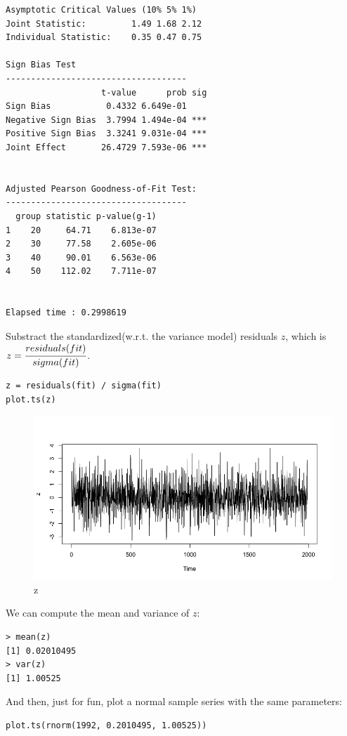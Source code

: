 \documentclass[a4paper, 11pt]{article}
\begin{document}
\begin{verbatim}
Asymptotic Critical Values (10% 5% 1%)
Joint Statistic:     	 1.49 1.68 2.12
Individual Statistic:	 0.35 0.47 0.75

Sign Bias Test
------------------------------------
                   t-value      prob sig
Sign Bias           0.4332 6.649e-01    
Negative Sign Bias  3.7994 1.494e-04 ***
Positive Sign Bias  3.3241 9.031e-04 ***
Joint Effect       26.4729 7.593e-06 ***


Adjusted Pearson Goodness-of-Fit Test:
------------------------------------
  group statistic p-value(g-1)
1    20     64.71    6.813e-07
2    30     77.58    2.605e-06
3    40     90.01    6.563e-06
4    50    112.02    7.711e-07


Elapsed time : 0.2998619 
\end{verbatim}

\indent Substract the standardized(w.r.t. the variance model) residuals $z$, which is $z = \cfrac{residuals(fit)}{sigma(fit)}$.

\begin{verbatim}
z = residuals(fit) / sigma(fit)
plot.ts(z)
\end{verbatim}

\begin{figure}[H]
\centering
\caption{z}
\includegraphics[scale=.40]{z.png}
\end{figure}

\indent We can compute the mean and variance of $z$:
\begin{verbatim}
> mean(z)
[1] 0.02010495
> var(z)
[1] 1.00525
\end{verbatim} 
\indent And then, just for fun, plot a normal sample series with the same parameters:
\begin{verbatim}
plot.ts(rnorm(1992, 0.2010495, 1.00525))
\end{verbatim}
\end{document}
